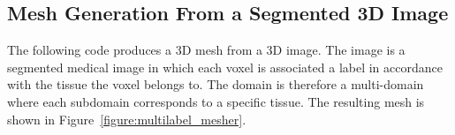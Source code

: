 \subsection{Mesh Generation From a Segmented 3D Image}

The following code produces  a 3D mesh from
a 3D image. The image is a segmented medical image  in which each 
voxel  is associated a label  in accordance with
the tissue  the voxel belongs to.
The domain is therefore a multi-domain
where each subdomain corresponds to a specific tissue.
The resulting mesh is shown in Figure~\ref{figure:multilabel_mesher}.

